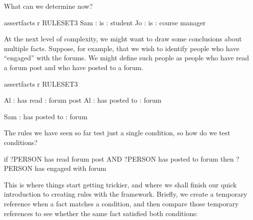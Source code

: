 \documentclass[letterpaper,10pt,english]{sphinxmanual}
\begin{document}
What can we determine now?

{
\begin{sphinxVerbatim}[commandchars=\\\{\}]
\llap{\color{nbsphinxin}[ ]:\,\hspace{\fboxrule}\hspace{\fboxsep}}\PYGZpc{}\PYGZpc{}assert\PYGZus{}facts \PYGZhy{}r RULESET\PYGZus{}3
Sam : is : student
Jo : is : course manager
\end{sphinxVerbatim}
}

At the next level of complexity, we might want to draw some conclusions about multiple facts. Suppose, for example, that we wish to identify people who have “engaged” with the forums. We might define such people as people who have read a forum post and who have posted to a forum.

{
\begin{sphinxVerbatim}[commandchars=\\\{\}]
\llap{\color{nbsphinxin}[ ]:\,\hspace{\fboxrule}\hspace{\fboxsep}}\PYGZpc{}\PYGZpc{}assert\PYGZus{}facts \PYGZhy{}r RULESET\PYGZus{}3

Al : has read : forum post
Al : has posted to : forum

Sam : has posted to : forum
\end{sphinxVerbatim}
}

The rules we have seen so far test just a single condition, so how do we test  conditions?

\begin{sphinxVerbatim}[commandchars=\\\{\}]
if ?PERSON has read forum post AND ?PERSON has posted to forum
then ?PERSON has engaged with forum
\end{sphinxVerbatim}

This is where things start getting trickier, and where we shall finish our quick introduction to creating rules with the  framework. Briefly, we create a temporary reference when a fact matches a condition, and then compare those temporary references to see whether the same fact satisfied both conditions:
\end{document}
